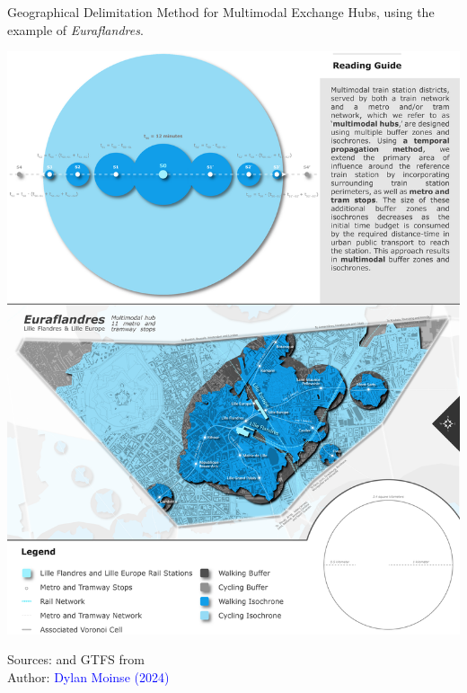\begin{refsegment}
    \begin{carte}[h!]\vspace*{4pt}
        \caption{Geographical Delimitation Method for Multimodal Exchange Hubs, using the example of \textsl{Euraflandres}.}
        \label{fig-chap3:carte-calcul-multimodal-hubs-euraflandres}
        \centerline{\includegraphics[width=1\columnwidth]{src/Figures/Chap-3/EN_Carte_Euraflandres.png}}
        \vspace{5pt}
        \begin{flushright}\scriptsize{
        Sources: \textcolor{blue}{\textcite{openstreetmap_openstreetmap_2023}} and \acrshort{GTFS} from \textcolor{blue}{\textcite{sncf_reseau_2024}}
        \\
        Author: \textcolor{blue}{Dylan Moinse (2024)}
        }\end{flushright}
    \end{carte}


\end{refsegment}
